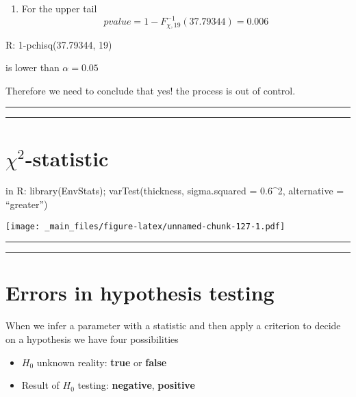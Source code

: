 \documentclass[
]{book}
\providecommand{\tightlist}{%
  \setlength{\itemsep}{0pt}\setlength{\parskip}{0pt}}
\begin{document}
\begin{enumerate}
\def\labelenumi{\arabic{enumi}.}
\setcounter{enumi}{1}
\tightlist
\item
  For the upper tail \[pvalue=1-F_{\chi,19}^{-1}(37.79344)= 0.006\]
\end{enumerate}

R: 1-pchisq(37.79344, 19)

is lower than \(\alpha=0.05\)

Therefore we need to conclude that yes! the process is out of control.

\begin{center}\rule{0.5\linewidth}{0.5pt}\end{center}

\begin{center}\rule{0.5\linewidth}{0.5pt}\end{center}

\hypertarget{chi2-statistic-3}{%
\section{\texorpdfstring{\(\chi^2\)-statistic}{\textbackslash chi\^{}2-statistic}}\label{chi2-statistic-3}}

in R: library(EnvStats);
varTest(thickness, sigma.squared = 0.6\^{}2, alternative = ``greater'')

\texttt{[image: \_main\_files/figure-latex/unnamed-chunk-127-1.pdf]}

\begin{center}\rule{0.5\linewidth}{0.5pt}\end{center}

\begin{center}\rule{0.5\linewidth}{0.5pt}\end{center}

\hypertarget{errors-in-hypothesis-testing}{%
\section{Errors in hypothesis testing}\label{errors-in-hypothesis-testing}}

When we infer a parameter with a statistic and then apply a criterion to decide on a hypothesis we have four possibilities

\begin{itemize}
\tightlist
\item
  \(H_0\) unknown reality: \textbf{true} or \textbf{false}
\item
  Result of \(H_0\) testing: \textbf{negative}, \textbf{positive}
\end{itemize}
\end{document}
